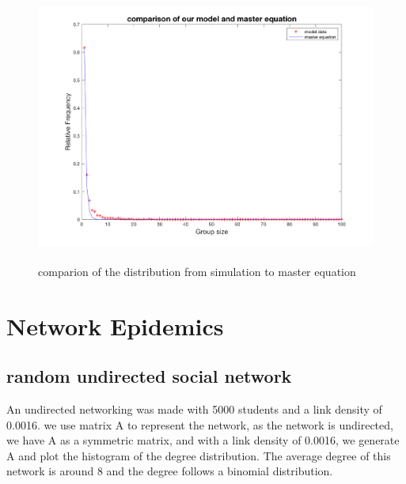 \documentclass[12pt]{article}
\begin{document}
\begin{figure}[H] %
\centering
\includegraphics[width = 12 cm, height = 9cm]{me1.png}
\caption{comparion of the distribution from simulation to master equation}
\label{fig:mecompare}
\end{figure}




\newpage
\section{Network Epidemics}
\doublespacing

\subsection{random undirected social network}

An undirected networking was made with 5000 students and a link density of 0.0016. we use matrix A to represent the network, as the network is undirected, we have A as a symmetric matrix, and with a link density of 0.0016, we generate A and plot the histogram of the degree distribution. The average degree of this network is around 8 and the degree follows a binomial distribution. 
\end{document}
